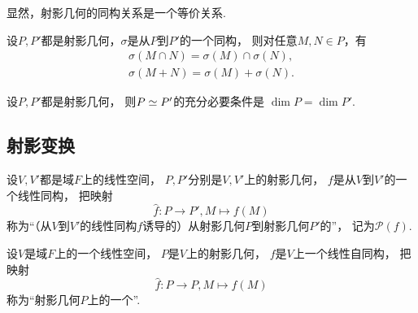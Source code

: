 显然，射影几何的同构关系是一个等价关系.

\begin{property}
设\(P,P'\)都是射影几何，\(\sigma\)是从\(P\)到\(P'\)的一个同构，
则对任意\(M,N \in P\)，有\begin{gather*}
	\sigma(M \cap N) = \sigma(M) \cap \sigma(N), \\
	\sigma(M + N) = \sigma(M) + \sigma(N).
\end{gather*}
\end{property}

\begin{theorem}%
设\(P,P'\)都是射影几何，
则\(P \simeq P'\)的充分必要条件是
\(\dim P = \dim P'\).
\end{theorem}

\subsection{射影变换}
\begin{definition}
设\(V,V'\)都是域\(F\)上的线性空间，
\(P,P'\)分别是\(V,V'\)上的射影几何，
\(f\)是从\(V\)到\(V'\)的一个线性同构，
把映射\begin{equation*}
	\hat{f}\colon P \to P',
	M \mapsto f(M)
\end{equation*}
称为“（从\(V\)到\(V'\)的线性同构\(f\)诱导的）从射影几何\(P\)到射影几何\(P'\)的”，
记为\(\mathcal{P}(f)\).
\end{definition}

\begin{definition}
设\(V\)是域\(F\)上的一个线性空间，
\(P\)是\(V\)上的射影几何，
\(f\)是\(V\)上一个线性自同构，
把映射\begin{equation*}
	\hat{f}\colon P \to P,
	M \mapsto f(M)
\end{equation*}
称为“射影几何\(P\)上的一个”.
\end{definition}

